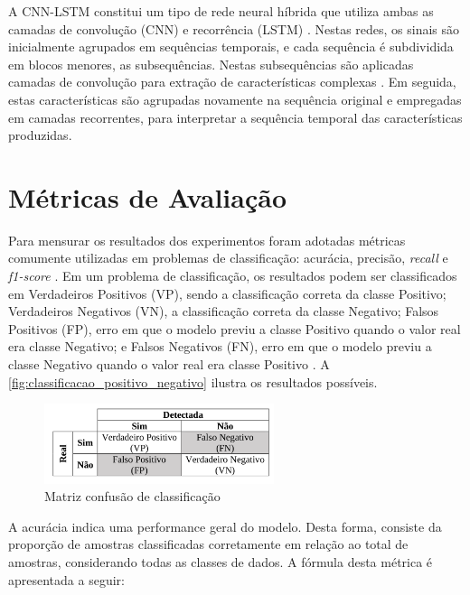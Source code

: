A CNN-LSTM constitui um tipo de rede neural híbrida que utiliza ambas as camadas de convolução (CNN) e recorrência (LSTM) \cite{Deep2019}. Nestas redes, os sinais são inicialmente agrupados em sequências temporais, e cada sequência é subdividida em blocos menores, as subsequências. Nestas subsequências são aplicadas camadas de convolução para extração de características complexas \cite{Deep2019}. Em seguida, estas características são agrupadas novamente na sequência original e empregadas em camadas recorrentes, para interpretar a sequência temporal das características produzidas.

\section{Métricas de Avaliação}

Para mensurar os resultados dos experimentos foram adotadas métricas comumente utilizadas em problemas de classificação: acurácia, precisão, \textit{recall} e \textit{f1-score} \cite{Rodrigues2020,Rodrigues2021,Shung2020}. Em um problema de classificação, os resultados podem ser classificados em Verdadeiros Positivos (VP), sendo a classificação correta da classe Positivo; Verdadeiros Negativos (VN), a classificação correta da classe Negativo; Falsos Positivos (FP), erro em que o modelo previu a classe Positivo quando o valor real era classe Negativo; e Falsos Negativos (FN), erro em que o modelo previu a classe Negativo quando o valor real era classe Positivo \cite{Rodrigues2020}. A \autoref{fig:classificacao_positivo_negativo} ilustra os resultados possíveis.

\begin{figure}[h]
  \centering
  \caption{Matriz confusão de classificação}
   \label{fig:classificacao_positivo_negativo}
   \includegraphics[width=0.6\textwidth]{figuras/fig_13.png}
\end{figure}

A acurácia indica uma performance geral do modelo. Desta forma, consiste da proporção de amostras classificadas corretamente em relação ao total de amostras, considerando todas as classes de dados. A fórmula desta métrica é apresentada a seguir:

